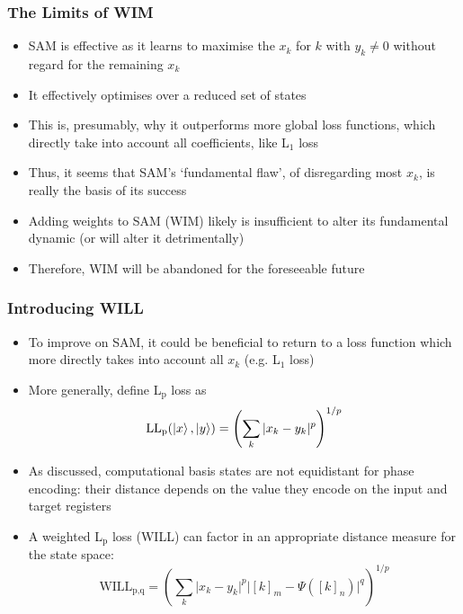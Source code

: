 \documentclass{beamer}
\begin{document}
\begin{frame}
\frametitle{The Limits of WIM}
\begin{itemize}
\item SAM is effective as it learns to maximise the $x_k$ for $k$ with $y_k \neq 0$ without regard for the remaining $x_k$
\item It effectively optimises over a \alert{reduced set of states} 
\item This is, presumably, why it outperforms more global loss functions, which directly take into account all coefficients, like L$_1$ loss 
\item Thus, it seems that SAM's \alert{`fundamental flaw'}, of disregarding most $x_k$, is really the \alert{basis of its success} 
\item Adding weights to SAM (WIM) likely is insufficient to alter its fundamental dynamic (or will alter it detrimentally)  
\item Therefore, \alert{WIM will be abandoned for the foreseeable future}
\end{itemize}
\end{frame}

\begin{frame}
\frametitle{Introducing WILL}
\begin{itemize}
\item To improve on SAM, it could be beneficial to return to a loss function which more directly takes into account all $x_k$ (e.g. L$_1$ loss)
\item More generally, define \alert{L$_\text{p}$ loss} as 
\begin{equation}
\text{LL}_\text{p} (\ket{x}, \ket{y}) = \left( \sum_k |x_k -y_k|^p \right)^{1/p}
\end{equation}
\item As discussed, \alert{computational basis states are not equidistant} for phase encoding: their distance depends on the value they encode on the input and target registers
\item A \alert{weighted L$_\text{p}$ loss (WILL)} can factor in an appropriate distance measure for the state space:
\begin{equation}
\text{WILL}_\text{p,q} =  \left( \sum_k \Big|x_k -y_k \Big|^p \Big|[k]_m - \Psi([k]_n) \Big|^q \right)^{1/p}
\end{equation}
\end{itemize}
\end{frame}
\end{document}
